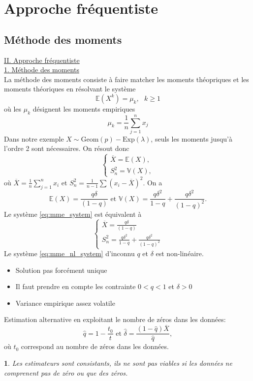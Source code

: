 \documentclass[8pt,notheorems]{beamer}
\newtheorem{remark}{\translate{Remark}}
\theoremstyle{definition}
\theoremstyle{example}
\theoremstyle{mystyle}
\theoremstyle{plain}
\begin{document}
\section{Approche fréquentiste}
\subsection{Méthode des moments}
\begin{frame}[allowframebreaks]
\underline{II. Approche fréquentiste}\\
\underline{1. Méthode des moments}\\

La méthode des moments consiste à faire matcher les moments théopriques et les moments théoriques en résolvant le système $$
\mathbb{E}(X^k) = \mu_k,\text{ }k\geq1
$$ 
où les $\mu_k$ désignent les moments empiriques
$$
\mu_k = \frac{1}{n}\sum_{j = 1}^nx_j
$$
Dans notre exemple $X\sim\text{Geom}(p)-\text{Exp}(\lambda)$, seuls les moments jusqu'à l'ordre 2 sont nécessaires. On résout donc 
\begin{equation}\label{eq:mme_system}
\begin{cases}
\overline{X} =\mathbb{E}(X), \\
S_n^2 =\mathbb{V}(X) ,
\end{cases}
\end{equation}
où $\overline{X} = \frac{1}{n}\sum_{j = 1}^n x_i$ et $S_n^2 = \frac{1}{n-1}\sum(x_i-\overline{X})^2$. On a 
$$
\mathbb{E}(X) = \frac{q \delta}{(1-q)}\text{ et }\mathbb{V}(X) =\frac{q\delta^2}{1-q}+\frac{q\delta^2}{(1-q)^2}. 
$$
Le système \eqref{eq:mme_system} est équivalent à 
\begin{equation}\label{eq:mme_nl_system}
\begin{cases}
\overline{X} = \frac{q \delta}{(1-q)}\\
S_n^2 = \frac{q\delta^2}{1-q}+\frac{q\delta^2}{(1-q)^2}
\end{cases}
\end{equation}
Le système \eqref{eq:mme_nl_system} d'inconnu $q$ et $\delta$ est non-linéaire. 
\begin{itemize}
    \item Solution pas forcément unique
    \item Il faut prendre en compte les contrainte $0< q <1$ et $\delta >0$
    \item Variance empirique assez volatile
\end{itemize}
Estimation alternative en exploitant le nombre de zéros dans les données:
$$
\widehat{q} = 1 -  \frac{t_0}{t}\text{ et }\widehat{\delta} = \frac{(1-\widehat{q})\overline{X}}{\widehat{q}},
$$
où $t_0$ correspond au nombre de zéros dans les données.
\begin{remark}
 Les estimateurs sont consistants, ils ne sont pas viables si les données ne comprenent pas de zéro ou que des zéros.
\end{remark}
\end{frame}
\end{document}
